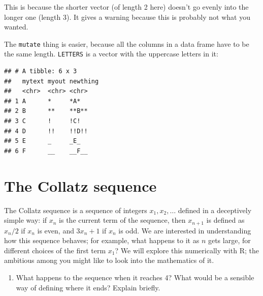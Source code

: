 \documentclass[]{tufte-book}
\newenvironment{Shaded}{}{}
\newcommand{\DataTypeTok}[1]{\textcolor[rgb]{0.56,0.13,0.00}{#1}}
\newcommand{\DecValTok}[1]{\textcolor[rgb]{0.25,0.63,0.44}{#1}}
\newcommand{\KeywordTok}[1]{\textcolor[rgb]{0.00,0.44,0.13}{\textbf{#1}}}
\newcommand{\NormalTok}[1]{#1}
\newcommand{\OperatorTok}[1]{\textcolor[rgb]{0.40,0.40,0.40}{#1}}
\newcommand{\StringTok}[1]{\textcolor[rgb]{0.25,0.44,0.63}{#1}}
\providecommand{\tightlist}{%
  \setlength{\itemsep}{0pt}\setlength{\parskip}{0pt}}
\theoremstyle{definition}
\theoremstyle{definition}
\theoremstyle{definition}
\theoremstyle{remark}
\begin{document}
This is because the shorter vector (of length 2 here) doesn't go evenly
into the longer one (length 3). It gives a warning because this is
probably not what you wanted.

The \texttt{mutate} thing is easier, because all the columns in a data
frame have to be the same length. \texttt{LETTERS} is a vector with the
uppercase letters in it:

\begin{Shaded}
\end{Shaded}

\begin{verbatim}
## # A tibble: 6 x 3
##   mytext myout newthing
##   <chr>  <chr> <chr>   
## 1 A      *     *A*     
## 2 B      **    **B**   
## 3 C      !     !C!     
## 4 D      !!    !!D!!   
## 5 E      _     _E_     
## 6 F      __    __F__
\end{verbatim}

\hypertarget{the-collatz-sequence}{%
\section{The Collatz sequence}\label{the-collatz-sequence}}

The Collatz sequence is a sequence of integers \(x_1, x_2, \ldots\)
defined in a deceptively simple way: if \(x_n\) is the current term of
the sequence, then \(x_{n+1}\) is defined as \(x_n/2\) if \(x_n\) is
even, and \(3x_n+1\) if \(x_n\) is odd. We are interested in
understanding how this sequence behaves; for example, what happens to it
as \(n\) gets large, for different choices of the first term \(x_1\)? We
will explore this numerically with R; the ambitious among you might like
to look into the mathematics of it.

\begin{enumerate}
\def\labelenumi{(\alph{enumi})}
\tightlist
\item
  What happens to the sequence when it reaches 4? What would be a
  sensible way of defining where it ends? Explain briefly.
\end{enumerate}
\end{document}
